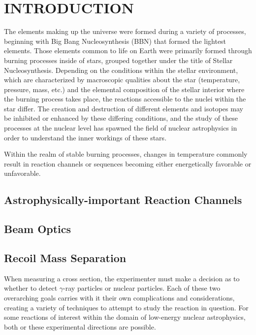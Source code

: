 \chapter{INTRODUCTION}

The elements making up the universe were formed during a variety of processes,
beginning with Big Bang Nucleosynthesis (BBN) that formed the lightest
elements. Those elements common to life on Earth were primarily formed through
burning processes inside of stars, grouped together under the title of
Stellar Nucleosynthesis. Depending on the conditions within the stellar
environment, which are characterized by macroscopic qualities about the star
(temperature, pressure, mass, etc.) and the elemental composition of the
stellar interior where the burning process takes place, the reactions
accessible to the nuclei within the star differ. The creation and destruction
of different elements and isotopes may be inhibited or enhanced by these
differing conditions, and the study of these processes at the nuclear level
has spawned the field of nuclear astrophysics in order to understand the inner
workings of these stars.

Within the realm of stable burning processes, changes in temperature commonly
result in reaction channels or sequences becoming either energetically
favorable or unfavorable.



\section{Astrophysically-important Reaction Channels}




\section{Beam Optics}



\section{Recoil Mass Separation}

When measuring a cross section, the experimenter must make a decision as to
whether to detect $\gamma$-ray particles or nuclear particles. Each of these
two overarching goals carries with it their own complications and
considerations, creating a variety of techniques to attempt to study the
reaction in question. For some reactions of interest within the domain of
low-energy nuclear astrophysics, both or these experimental directions are
possible.

